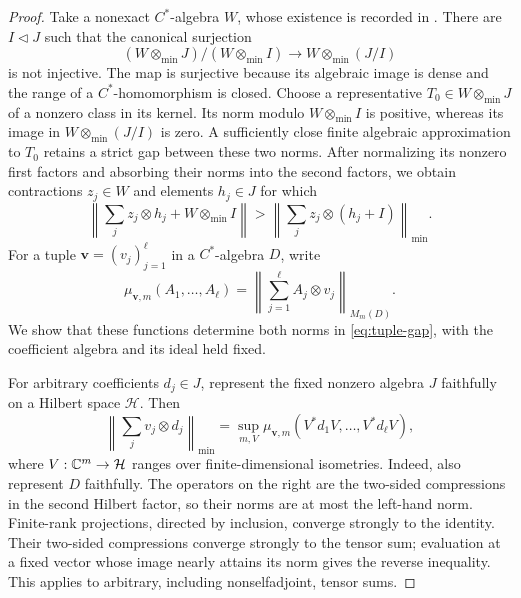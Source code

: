 \begin{proof}
Take a nonexact \(C^*\)-algebra \(W\), whose existence is recorded
in \cite[Remark~(i) following Theorem~1, pp.~163--164]{Pisier1995}.
There are
\(I\triangleleft J\) such that the canonical surjection
\[
 (W\otimes_{\min}J)/(W\otimes_{\min}I)
 \longrightarrow W\otimes_{\min}(J/I)
\]
is not injective.  The map is surjective because its algebraic image
is dense and the range of a \(C^*\)-homomorphism is closed.  Choose a
representative \(T_0\in W\otimes_{\min}J\) of a nonzero class in its
kernel.  Its norm modulo \(W\otimes_{\min}I\) is positive, whereas
its image in \(W\otimes_{\min}(J/I)\) is zero.  A sufficiently close
finite algebraic approximation to \(T_0\) retains a strict gap between
these two norms.  After normalizing its nonzero first factors and
absorbing their norms into the second factors, we obtain contractions
\(z_j\in W\) and elements \(h_j\in J\) for which
\begin{equation}\label{eq:tuple-gap}
 \left\|\sum_j z_j\otimes h_j+W\otimes_{\min}I\right\|
 >\left\|\sum_j z_j\otimes(h_j+I)\right\|_{\min}.
\end{equation}
For a tuple \(\mathbf v=(v_j)_{j=1}^{\ell}\) in a \(C^*\)-algebra
\(D\), write
\[
 \mu_{\mathbf v,m}(A_1,\ldots,A_\ell)
 =\left\|\sum_{j=1}^{\ell}A_j\otimes v_j\right\|_{M_m(D)}.
\]
We show that these functions determine both norms in
\eqref{eq:tuple-gap}, with the coefficient algebra and its ideal
held fixed.

For arbitrary coefficients \(d_j\in J\), represent the fixed
nonzero algebra \(J\) faithfully on a Hilbert space \(\mathcal H\).
Then
\begin{equation}\label{eq:tuple-compression-formula}
 \left\|\sum_j v_j\otimes d_j\right\|_{\min}
 =\sup_{m,V}
 \mu_{\mathbf v,m}(V^*d_1V,\ldots,V^*d_\ell V),
\end{equation}
where \(V:\mathbb C^m\to\mathcal H\) ranges over finite-dimensional
isometries.  Indeed, also represent \(D\) faithfully.  The operators
on the right are the two-sided compressions in the second Hilbert
factor, so their norms are at most the left-hand norm.  Finite-rank
projections, directed by inclusion, converge strongly to the
identity.  Their two-sided compressions converge strongly to the
tensor sum; evaluation at a fixed vector whose image nearly attains
its norm gives the reverse inequality.  This applies to arbitrary,
including nonselfadjoint, tensor sums.


\end{proof}

